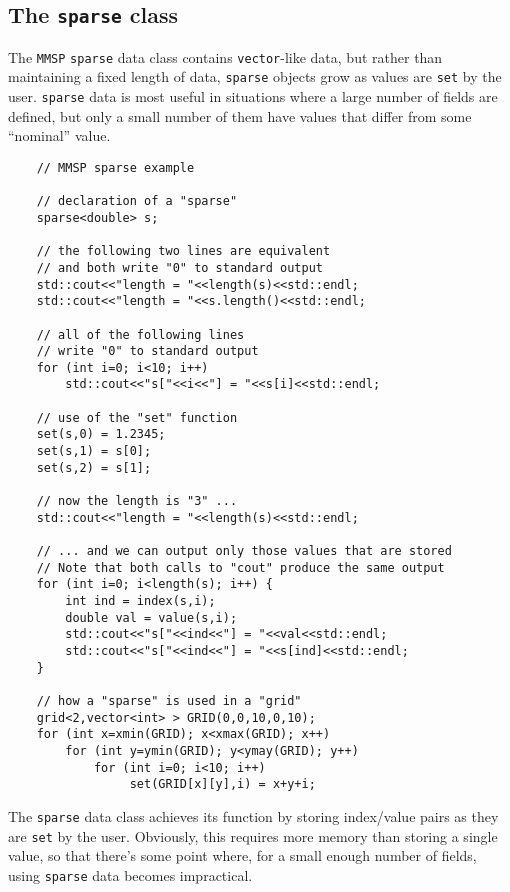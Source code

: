 \subsection{The {\tt sparse} class}
The {\tt MMSP} {\tt sparse} data class contains {\tt vector}-like data, but rather than maintaining a fixed length of data, {\tt sparse} objects grow as values are {\tt set} by the user.  {\tt sparse} data is most useful in situations where a large number of fields are defined, but only a small number of them have values that differ from some ``nominal'' value.
\begin{shadebox}
\begin{verbatim}
    // MMSP sparse example

    // declaration of a "sparse"
    sparse<double> s;

    // the following two lines are equivalent
    // and both write "0" to standard output
    std::cout<<"length = "<<length(s)<<std::endl;
    std::cout<<"length = "<<s.length()<<std::endl;

    // all of the following lines
    // write "0" to standard output
    for (int i=0; i<10; i++)
        std::cout<<"s["<<i<<"] = "<<s[i]<<std::endl;

    // use of the "set" function
    set(s,0) = 1.2345;
    set(s,1) = s[0];
    set(s,2) = s[1];

    // now the length is "3" ...
    std::cout<<"length = "<<length(s)<<std::endl;

    // ... and we can output only those values that are stored
    // Note that both calls to "cout" produce the same output
    for (int i=0; i<length(s); i++) {
        int ind = index(s,i);
        double val = value(s,i);
        std::cout<<"s["<<ind<<"] = "<<val<<std::endl;
        std::cout<<"s["<<ind<<"] = "<<s[ind]<<std::endl;
	}

    // how a "sparse" is used in a "grid"
    grid<2,vector<int> > GRID(0,0,10,0,10);
    for (int x=xmin(GRID); x<xmax(GRID); x++)
        for (int y=ymin(GRID); y<ymay(GRID); y++)
            for (int i=0; i<10; i++)
                 set(GRID[x][y],i) = x+y+i;
\end{verbatim}
\end{shadebox}
The {\tt sparse} data class achieves its function by storing index/value pairs as they are {\tt set} by the user.  Obviously, this requires more memory than storing a single value, so that there's some point where, for a small enough number of fields, using {\tt sparse} data becomes impractical.

